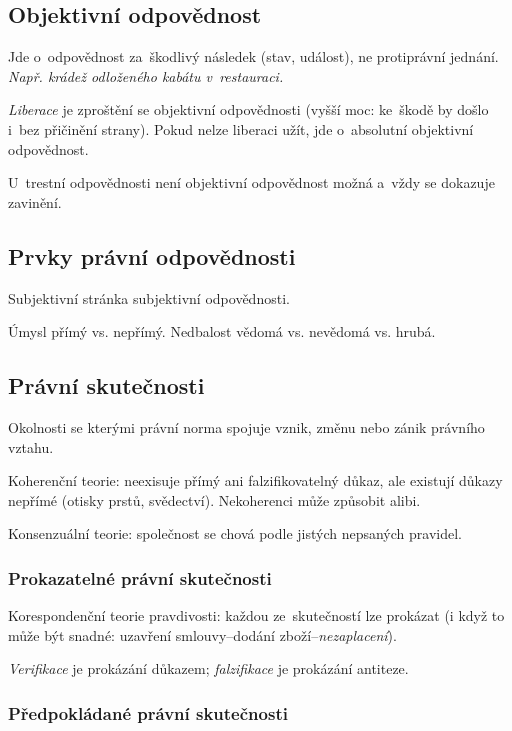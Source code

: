 \subsection{Objektivní odpovědnost}


Jde o~odpovědnost za~škodlivý následek (stav, událost), ne protiprávní jednání.
\emph{Např. krádež odloženého kabátu v~restauraci.}

\emph{Liberace} je zproštění se objektivní odpovědnosti (vyšší moc: ke~škodě by došlo i~bez přičinění strany).
Pokud nelze liberaci užít, jde o~absolutní objektivní odpovědnost.

U~trestní odpovědnosti není objektivní odpovědnost možná a~vždy se dokazuje zavinění.


\subsection{Prvky právní odpovědnosti}

Subjektivní stránka subjektivní odpovědnosti.

Úmysl přímý vs. nepřímý.
Nedbalost vědomá vs. nevědomá vs. hrubá.


\subsection{Právní skutečnosti}

Okolnosti se kterými právní norma spojuje vznik, změnu nebo zánik právního vztahu.

Koherenční teorie: neexisuje přímý ani falzifikovatelný důkaz, ale existují důkazy nepřímé (otisky prstů, svědectví).
Nekoherenci může způsobit alibi.

Konsenzuální teorie: společnost se chová podle jistých nepsaných pravidel.


\subsubsection{Prokazatelné právní skutečnosti}

Korespondenční teorie pravdivosti: každou ze~skutečností lze prokázat (i když to může být snadné: uzavření smlouvy--dodání zboží--\emph{nezaplacení}).

\emph{Verifikace} je prokázání důkazem; \emph{falzifikace} je prokázání antiteze.


\subsubsection{Předpokládané právní skutečnosti}

